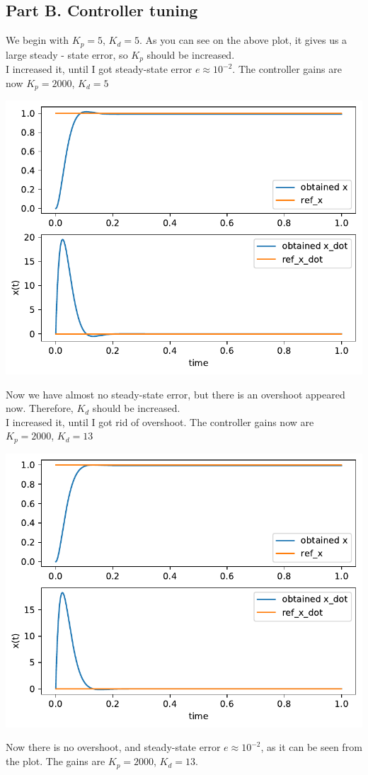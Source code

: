 \documentclass[a4paper,12pt]{article}
\begin{document}
    \subsection*{Part B. Controller tuning}
        We begin with $K_p = 5$, $K_d = 5$. As you can see on the above plot, 
        it gives us a large steady - state error, so $K_p$ should be increased.\\ 
        I increased it, 
        until I got steady-state error $e \approx 10^{-2}$. The controller gains 
        are now $K_p = 2000$, $K_d = 5$
        \begin{center}
            \includegraphics[width = 0.72\linewidth]{2b_1.pdf}
        \end{center}
        Now we have almost no steady-state error, but there is an overshoot appeared
        now. Therefore, $K_d$ should be increased.\\
        I increased it, until I got rid of overshoot. The controller gains now are
        $K_p = 2000$, $K_d = 13$
        \begin{center}
            \includegraphics[width = 0.77\linewidth]{2b_2.pdf}
        \end{center}
        Now there is no overshoot, and steady-state error $e \approx 10^{-2}$, 
        as it can be seen from the plot. The gains are $K_p = 2000$, $K_d = 13$.
\end{document}
